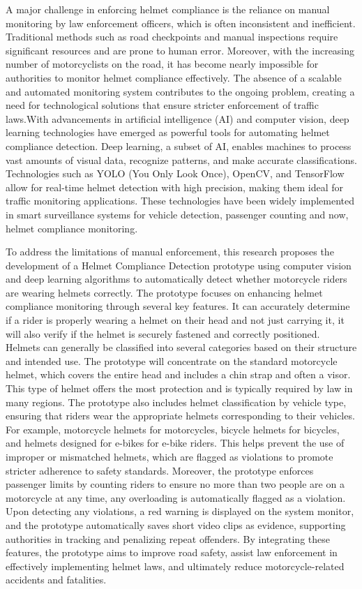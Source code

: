 \begin{refsection}
A major challenge in enforcing helmet compliance is the reliance on manual monitoring by law enforcement officers, which is often inconsistent and inefficient. Traditional methods such as road checkpoints and manual inspections require significant resources and are prone to human error. Moreover, with the increasing number of motorcyclists on the road, it has become nearly impossible for authorities to monitor helmet compliance effectively. The absence of a scalable and automated monitoring system contributes to the ongoing problem, creating a need for technological solutions that ensure stricter enforcement of traffic laws.With advancements in artificial intelligence (AI) and computer vision, deep learning technologies have emerged as powerful tools for automating helmet compliance detection. Deep learning, a subset of AI, enables machines to process vast amounts of visual data, recognize patterns, and make accurate classifications. Technologies such as YOLO (You Only Look Once), OpenCV, and TensorFlow allow for real-time helmet detection with high precision, making them ideal for traffic monitoring applications. These technologies have been widely implemented in smart surveillance systems for vehicle detection, passenger counting and now, helmet compliance monitoring.

To address the limitations of manual enforcement, this research proposes the development of a Helmet Compliance Detection prototype using computer vision and deep learning algorithms to automatically detect whether motorcycle riders are wearing helmets correctly. The prototype focuses on enhancing helmet compliance monitoring through several key features. It can accurately determine if a rider is properly wearing a helmet on their head and not just carrying it,  it will  also verify if the helmet is securely fastened and correctly positioned.  Helmets can generally be classified into several categories based on their structure and intended use. The prototype will concentrate on the standard motorcycle helmet, which covers the entire head and includes a chin strap and often a visor. This type of helmet offers the most protection and is typically required by law in many regions. The prototype also includes helmet classification by vehicle type, ensuring that riders wear the appropriate helmets corresponding to their vehicles. For example, motorcycle helmets for motorcycles, bicycle helmets for bicycles, and helmets designed for e-bikes for e-bike riders. This helps prevent the use of improper or mismatched helmets, which are flagged as violations to promote stricter adherence to safety standards.
Moreover, the prototype enforces passenger limits by counting riders to ensure no more than two people are on a motorcycle at any time, any overloading is automatically flagged as a violation. Upon detecting any violations,  a red warning is displayed on the system monitor, and the prototype automatically saves short video clips as evidence, supporting authorities in tracking and penalizing repeat offenders. By integrating these features, the prototype aims to improve road safety, assist law enforcement in effectively implementing helmet laws, and ultimately reduce motorcycle-related accidents and fatalities.


\end{refsection}
